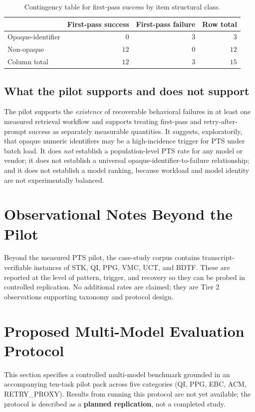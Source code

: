 \documentclass[11pt]{article}
\begin{document}
\begin{table}[h]
\centering\small
\caption{Contingency table for first-pass success by item structural class.}
\label{tab:contingency}
\begin{tabular}{l r r r}
\toprule
                       & \textbf{First-pass success} & \textbf{First-pass failure} & \textbf{Row total} \\
\midrule
Opaque-identifier      & $0$  & $3$ & $3$  \\
Non-opaque             & $12$ & $0$ & $12$ \\
\midrule
Column total           & $12$ & $3$ & $15$ \\
\bottomrule
\end{tabular}
\end{table}

\subsection{What the pilot supports and does not support}
The pilot supports the \emph{existence} of recoverable behavioral failures in at least one measured retrieval workflow and supports treating first-pass and retry-after-prompt success as separately measurable quantities. It suggests, exploratorily, that opaque numeric identifiers may be a high-incidence trigger for PTS under batch load. It does \emph{not} establish a population-level PTS rate for any model or vendor; it does not establish a universal opaque-identifier-to-failure relationship; and it does not establish a model ranking, because workload and model identity are not experimentally balanced.

\section{Observational Notes Beyond the Pilot}
Beyond the measured PTS pilot, the case-study corpus contains transcript-verifiable instances of STK, QI, PPG, VMC, UCT, and BDTF. These are reported at the level of pattern, trigger, and recovery so they can be probed in controlled replication. No additional rates are claimed; they are Tier 2 observations supporting taxonomy and protocol design.

\section{Proposed Multi-Model Evaluation Protocol}
\label{sec:protocol}

This section specifies a controlled multi-model benchmark grounded in an accompanying ten-task pilot pack across five categories (QI, PPG, EBC, ACM, RETRY\_PROXY). Results from running this protocol are not yet available; the protocol is described as a \textbf{planned replication}, not a completed study.
\end{document}
